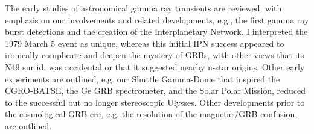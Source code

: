 


\bigskip



\bigskip

\noindent The early studies of astronomical gamma ray transients are reviewed, with emphasis on our involvements and related developments, e.g., the first gamma ray burst detections and the creation of the Interplanetary Network. I interpreted the 1979 March 5 event as unique, whereas this initial IPN success appeared to ironically complicate and deepen the mystery of GRBs, with other views that its N49 snr id. was accidental or that it suggested nearby n-star origins. Other early experiments are outlined, e.g. our Shuttle Gamma-Dome that inspired the CGRO-BATSE, the Ge GRB spectrometer, and the Solar Polar Mission, reduced to the successful but no longer stereoscopic Ulysses. Other developments prior to the cosmological GRB era, e.g. the resolution of the magnetar/GRB confusion, are outlined.
